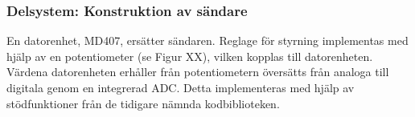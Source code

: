 \documentclass[a4paper]{article}
\begin{document}




\subsubsection{Delsystem: Konstruktion av sändare}
En datorenhet, MD407, ersätter sändaren. Reglage för styrning implementas med hjälp av en potentiometer (se Figur XX), vilken kopplas till datorenheten. Värdena datorenheten erhåller från potentiometern översätts från analoga till digitala genom en integrerad ADC. Detta implementeras med hjälp av stödfunktioner från de tidigare nämnda kodbiblioteken.
\end{document}
